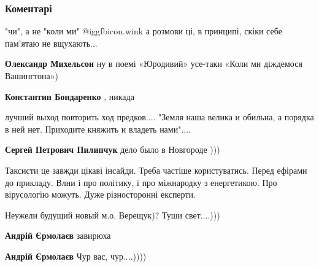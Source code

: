  
 
 
 
 
\subsubsection{Коментарі}
\label{sec:23_10_2021.fb.bondarenko_konstantin.1.ozhidanie_perevorot.cmt}

\begin{itemize} %

"чи", а не "коли ми"  @igg{fbicon.wink}  а розмови ці, в принципі, скіки себе пам'ятаю не
вщухають...

\begin{itemize} %
\textbf{Олександр Михельсон} ну в поемі «Юродивий» усе-таки «Коли ми діждемося Вашингтона»)

\textbf{Константин Бондаренко} , никада
\end{itemize} %


лучший выход повторить ход предков.... "Земля наша велика и обильна, а порядка
в ней нет. Приходите княжить и владеть нами"....

\begin{itemize} %
\textbf{Сергей Петрович Пилипчук} дело было в Новгороде )))
\end{itemize} %


Таксисти це завжди цікаві інсайди. Треба частіше користуватись. Перед ефірами
до прикладу. Влни і про політику, і про міжнародку з енергетикою. Про
вірусологію можуть. Дуже різносторонні експерти.


Неужели будущий новый м.о. Верещук)? Туши свет....)))

\begin{itemize} %
\textbf{Андрій Єрмолаєв} завирюха

\textbf{Андрій Єрмолаєв} Чур вас, чур....))))


\end{itemize}
\end{itemize}
